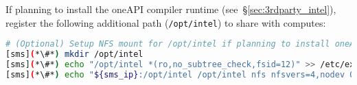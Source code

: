 \noindent If planning to install the \IntelR{} oneAPI compiler runtime
(see~\S\ref{sec:3rdparty_intel}), register the
following additional path (\texttt{/opt/intel}) to share with computes:
\begin{lstlisting}[language=bash,keywords={},upquote=true,keepspaces]
# (Optional) Setup NFS mount for /opt/intel if planning to install oneAPI packages
[sms](*\#*) mkdir /opt/intel
[sms](*\#*) echo "/opt/intel *(ro,no_subtree_check,fsid=12)" >> /etc/exports
[sms](*\#*) echo "${sms_ip}:/opt/intel /opt/intel nfs nfsvers=4,nodev 0 0" >> $CHROOT/etc/fstab
\end{lstlisting}
